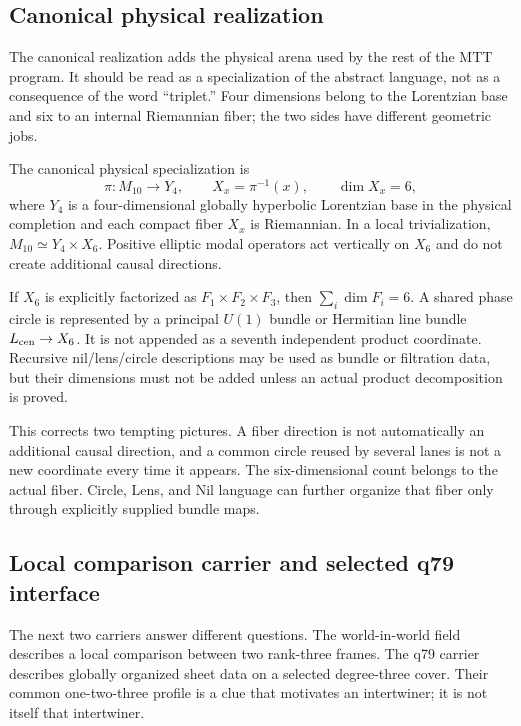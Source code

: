 \documentclass[11pt]{article}
\begin{document}
\subsection{Canonical physical realization}

The canonical realization adds the physical arena used by the rest of the MTT
program. It should be read as a specialization of the abstract language, not
as a consequence of the word ``triplet.'' Four dimensions belong to the
Lorentzian base and six to an internal Riemannian fiber; the two sides have
different geometric jobs.

The canonical physical specialization is
\[
 \pi:M_{10}\longrightarrow Y_4,
 \qquad X_x=\pi^{-1}(x),\qquad\dim X_x=6,
\]
where $Y_4$ is a four-dimensional globally hyperbolic Lorentzian base in the physical completion
and each compact fiber $X_x$ is Riemannian. In a local trivialization,
$M_{10}\simeq Y_4\times X_6$. Positive elliptic modal operators act vertically
on $X_6$ and do not create additional causal directions.

If $X_6$ is explicitly factorized as $F_1\times F_2\times F_3$, then
$\sum_i\dim F_i=6$. A shared phase circle is represented by a principal
$U(1)$ bundle or Hermitian line bundle $L_{\rm cen}\to X_6$. It is not appended
as a seventh independent product coordinate. Recursive nil/lens/circle
descriptions may be used as bundle or filtration data, but their dimensions
must not be added unless an actual product decomposition is proved.

This corrects two tempting pictures. A fiber direction is not automatically
an additional causal direction, and a common circle reused by several lanes
is not a new coordinate every time it appears. The six-dimensional count
belongs to the actual fiber. Circle, Lens, and Nil language can further
organize that fiber only through explicitly supplied bundle maps.

\subsection{Local comparison carrier and selected q79 interface}

The next two carriers answer different questions. The world-in-world field
describes a local comparison between two rank-three frames. The q79 carrier
describes globally organized sheet data on a selected degree-three cover.
Their common one-two-three profile is a clue that motivates an intertwiner;
it is not itself that intertwiner.
\end{document}
